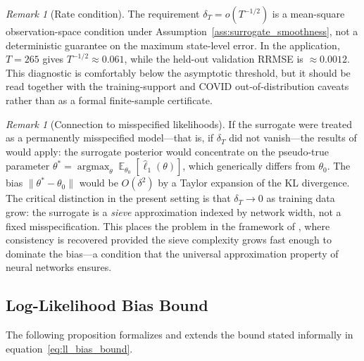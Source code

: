 \documentclass[12pt]{article}
\theoremstyle{plain}
\theoremstyle{definition}
\theoremstyle{remark}
\newtheorem{remark}[theorem]{Remark}
\DeclareMathOperator{\E}{\mathbb{E}}
\DeclareMathOperator{\argmax}{argmax}
\begin{document}
\begin{remark}[Rate condition]
\label{rem:rate_condition}
The requirement $\delta_T = o(T^{-1/2})$ is a mean-square observation-space condition under Assumption~\ref{ass:surrogate_smoothness}, not a deterministic guarantee on the maximum state-level error. In the application, $T = 265$ gives $T^{-1/2} \approx 0.061$, while the held-out validation RRMSE is $\approx 0.0012$. This diagnostic is comfortably below the asymptotic threshold, but it should be read together with the training-support and COVID out-of-distribution caveats rather than as a formal finite-sample certificate.
\end{remark}

\begin{remark}[Connection to misspecified likelihoods]
\label{rem:misspecified}
If the surrogate were treated as a permanently misspecified model---that is, if $\delta_T$ did not vanish---the results of \citet{kleijn2012bernstein} would apply: the surrogate posterior would concentrate on the pseudo-true parameter $\theta^* = \argmax_\theta \E_{\theta_0}[\hat{\ell}_1(\theta)]$, which generically differs from $\theta_0$. The bias $\|\theta^* - \theta_0\|$ would be $O(\delta^2)$ by a Taylor expansion of the KL divergence. The critical distinction in the present setting is that $\delta_T \to 0$ as training data grow: the surrogate is a \emph{sieve} approximation indexed by network width, not a fixed misspecification. This places the problem in the framework of \citet{mueller2013risk}, where consistency is recovered provided the sieve complexity grows fast enough to dominate the bias---a condition that the universal approximation property of neural networks ensures.
\end{remark}

\subsection{Log-Likelihood Bias Bound}

The following proposition formalizes and extends the bound stated informally in equation~\eqref{eq:ll_bias_bound}.
\end{document}
